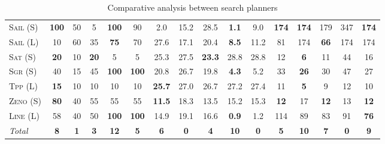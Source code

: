 \documentclass[11pt]{article}
\begin{document}
\begin{table*}[tb]
{\begin{tabular}{|l||ccccc||ccccc||ccccc||}
\textsc{Sail} (S)&\textbf{100}&50&5&\textbf{100}&90&2.0&15.2&28.5&\textbf{1.1}&9.0&\textbf{174}&\textbf{174}&179&347&\textbf{174}\\
\textsc{Sail} (L)&10&60&35&\textbf{75}&70&27.6&17.1&20.4&\textbf{8.5}&11.2&81&174&\textbf{66}&174&174\\
\textsc{Sat} (S)&\textbf{20}&10&\textbf{20}&5&5&25.3&27.5&\textbf{23.3}&28.8&28.8&12&\textbf{6}&11&44&16\\
\textsc{Sgr} (S)&40&15&45&\textbf{100}&\textbf{100}&20.8&26.7&19.8&\textbf{4.3}&5.2&33&\textbf{26}&30&47&27\\
\textsc{Tpp} (L)&\textbf{15}&10&10&10&10&\textbf{25.7}&27.0&26.7&27.2&27.4&11&\textbf{5}&9&12&10\\
\textsc{Zeno} (S)&\textbf{80}&40&55&55&55&\textbf{11.5}&18.3&13.5&15.2&15.3&\textbf{12}&17&\textbf{12}&13&\textbf{12}\\
\textsc{Line} (L)&58&40&50&\textbf{100}&\textbf{100}&14.9&19.1&16.6&\textbf{0.9}&1.2&114&89&83&91&\textbf{76}
\\\hline
\textit{Total}&\textbf{8}&\textbf{1}&\textbf{3}&\textbf{12}&\textbf{5}&\textbf{6}&\textbf{0}&\textbf{4}&\textbf{10}&\textbf{0}&\textbf{5}&\textbf{10}&\textbf{7}&\textbf{0}&\textbf{9}\\\hline

        \end{tabular}}
        \caption{Comparative analysis between search planners}
        \label{tab:search}
        \end{table*}
        
\end{document}
